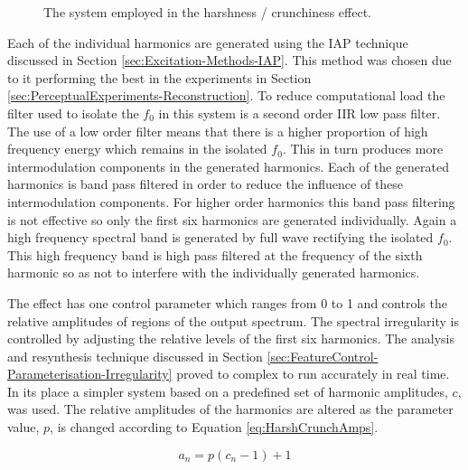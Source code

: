 \begin{figure}[h!]
				\caption{The system employed in the harshness / crunchiness effect.}
				\label{fig:HarshCrunch}
			\end{figure}

			Each of the individual harmonics are generated using the IAP technique discussed in Section
			\ref{sec:Excitation-Methods-IAP}. This method was chosen due to it performing the best in the
			experiments in Section \ref{sec:PerceptualExperiments-Reconstruction}. To reduce computational load
			the filter used to isolate the $f_{0}$ in this system is a second order IIR low pass filter.  The
			use of a low order filter means that there is a higher proportion of high frequency energy which
			remains in the isolated $f_{0}$. This in turn produces more intermodulation components in the
			generated harmonics. Each of the generated harmonics is band pass filtered in order to reduce the
			influence of these intermodulation components. For higher order harmonics this band pass filtering
			is not effective so only the first six harmonics are generated individually. Again a high frequency
			spectral band is generated by full wave rectifying the isolated $f_{0}$. This high frequency band
			is high pass filtered at the frequency of the sixth harmonic so as not to interfere with the
			individually generated harmonics.

			The effect has one control parameter which ranges from 0 to 1 and controls the relative amplitudes
			of regions of the output spectrum. The spectral irregularity is controlled by adjusting the
			relative levels of the first six harmonics. The analysis and resynthesis technique discussed in
			Section \ref{sec:FeatureControl-Parameterisation-Irregularity} proved to complex to run accurately
			in real time. In its place a simpler system based on a predefined set of harmonic amplitudes,
			$c$, was used. The relative amplitudes of the harmonics are altered as the parameter value, $p$,
			is changed according to Equation \ref{eq:HarshCrunchAmps}.

			\begin{equation}
				a_{n} = p(c_{n} - 1) + 1
				\label{eq:HarshCrunchAmps}
			\end{equation}

